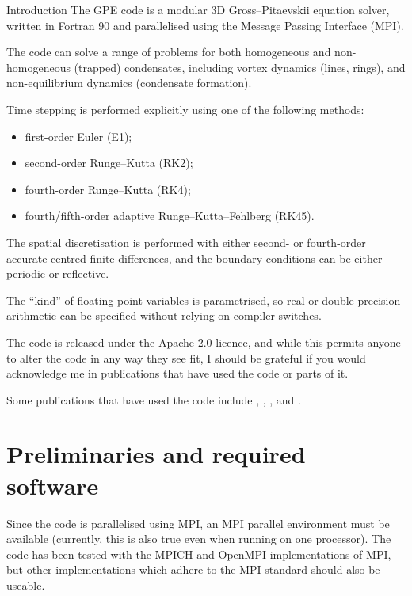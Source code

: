 %
%
%

\begin{chapter}{\label{cha:introduction}Introduction}
  The GPE code is a modular 3D Gross--Pitaevskii equation solver, written in
  Fortran 90 and parallelised using the Message Passing Interface (MPI).
  
  The code can solve a range of problems for both homogeneous and
  non-homogeneous (trapped) condensates, including vortex dynamics (lines,
  rings), and non-equilibrium dynamics (condensate formation).

  Time stepping is performed explicitly using one of the following methods:
  \begin{itemize}
    \item first-order Euler (E1);
    \item second-order Runge--Kutta (RK2);
    \item fourth-order Runge--Kutta (RK4);
    \item fourth/fifth-order adaptive Runge--Kutta--Fehlberg (RK45).
  \end{itemize}
  The spatial discretisation is performed with either second- or fourth-order
  accurate centred finite differences, and the boundary conditions can be
  either periodic or reflective.

  The ``kind'' of floating point variables is parametrised, so real or
  double-precision arithmetic can be specified without relying on compiler
  switches.

  The code is released under the Apache 2.0 licence, and while this permits
  anyone to alter the code in any way they see fit, I should be grateful if you
  would acknowledge me in publications that have used the code or parts of it.

  Some publications that have used the code include \citet{AYB08},
  \citet{WBPYW10}, \citet{TYB11}, and \citet{HBY11}.

  \section{\label{sec:prelim}Preliminaries and required software}
  Since the code is parallelised using MPI, an MPI parallel environment must be
  available (currently, this is also true even when running on one processor).
  The code has been tested with the MPICH and OpenMPI implementations of MPI,
  but other implementations which adhere to the MPI standard should also be
  useable.


\end{chapter}
